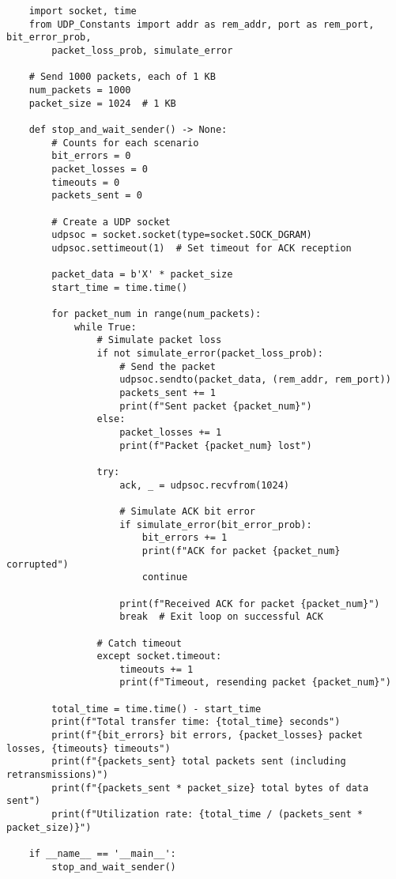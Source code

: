 \documentclass{article}
\begin{document}
\begin{verbatim}
    import socket, time
    from UDP_Constants import addr as rem_addr, port as rem_port, bit_error_prob,
        packet_loss_prob, simulate_error

    # Send 1000 packets, each of 1 KB
    num_packets = 1000
    packet_size = 1024  # 1 KB

    def stop_and_wait_sender() -> None:
        # Counts for each scenario
        bit_errors = 0
        packet_losses = 0
        timeouts = 0
        packets_sent = 0

        # Create a UDP socket
        udpsoc = socket.socket(type=socket.SOCK_DGRAM)
        udpsoc.settimeout(1)  # Set timeout for ACK reception

        packet_data = b'X' * packet_size
        start_time = time.time()
    
        for packet_num in range(num_packets):
            while True:
                # Simulate packet loss
                if not simulate_error(packet_loss_prob):
                    # Send the packet
                    udpsoc.sendto(packet_data, (rem_addr, rem_port))
                    packets_sent += 1
                    print(f"Sent packet {packet_num}")
                else:
                    packet_losses += 1
                    print(f"Packet {packet_num} lost")

                try:
                    ack, _ = udpsoc.recvfrom(1024)
                
                    # Simulate ACK bit error
                    if simulate_error(bit_error_prob):
                        bit_errors += 1
                        print(f"ACK for packet {packet_num} corrupted")
                        continue
                
                    print(f"Received ACK for packet {packet_num}")
                    break  # Exit loop on successful ACK

                # Catch timeout
                except socket.timeout:
                    timeouts += 1
                    print(f"Timeout, resending packet {packet_num}")

        total_time = time.time() - start_time
        print(f"Total transfer time: {total_time} seconds")
        print(f"{bit_errors} bit errors, {packet_losses} packet losses, {timeouts} timeouts")
        print(f"{packets_sent} total packets sent (including retransmissions)")
        print(f"{packets_sent * packet_size} total bytes of data sent")
        print(f"Utilization rate: {total_time / (packets_sent * packet_size)}")

    if __name__ == '__main__':
        stop_and_wait_sender()
\end{verbatim}
\end{document}

